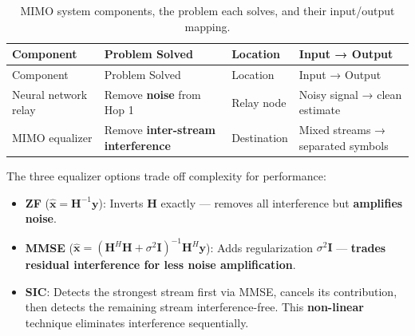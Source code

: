 \documentclass[
  english,
  12pt,
  12pt,
  a4paper,
  oneside]{report}
\providecommand{\tightlist}{%
  \setlength{\itemsep}{0pt}\setlength{\parskip}{0pt}}
\begin{document}
\begin{longtable}[]{@{}
  >{\raggedright\arraybackslash}p{}
  >{\raggedright\arraybackslash}p{}
  >{\raggedright\arraybackslash}p{}
  >{\raggedright\arraybackslash}p{}@{}}
\caption{MIMO system components, the problem each solves, and their input/output mapping.}\label{tbl:table27}\tabularnewline
\toprule\noalign{}
\begin{minipage}[b]{\linewidth}\raggedright
Component
\end{minipage} & \begin{minipage}[b]{\linewidth}\raggedright
Problem Solved
\end{minipage} & \begin{minipage}[b]{\linewidth}\raggedright
Location
\end{minipage} & \begin{minipage}[b]{\linewidth}\raggedright
Input → Output
\end{minipage} \\
\midrule\noalign{}
\endfirsthead
\toprule\noalign{}
\begin{minipage}[b]{\linewidth}\raggedright
Component
\end{minipage} & \begin{minipage}[b]{\linewidth}\raggedright
Problem Solved
\end{minipage} & \begin{minipage}[b]{\linewidth}\raggedright
Location
\end{minipage} & \begin{minipage}[b]{\linewidth}\raggedright
Input → Output
\end{minipage} \\
\midrule\noalign{}
\endhead
\bottomrule\noalign{}
\endlastfoot
Neural network relay & Remove \textbf{noise} from Hop 1 & Relay node & Noisy signal → clean estimate \\
MIMO equalizer & Remove \textbf{inter-stream interference} & Destination & Mixed streams → separated symbols \\
\end{longtable}

The three equalizer options trade off complexity for performance:

\begin{itemize}
\tightlist
\item
  \textbf{ZF} (\(\hat{\mathbf{x}} = \mathbf{H}^{-1}\mathbf{y}\)): Inverts \(\mathbf{H}\) exactly --- removes all interference but \textbf{amplifies noise}.
\item
  \textbf{MMSE} (\(\hat{\mathbf{x}} = (\mathbf{H}^H\mathbf{H} + \sigma^2\mathbf{I})^{-1}\mathbf{H}^H\mathbf{y}\)): Adds regularization \(\sigma^2\mathbf{I}\) --- \textbf{trades residual interference for less noise amplification}.
\item
  \textbf{SIC}: Detects the strongest stream first via MMSE, cancels its contribution, then detects the remaining stream interference-free. This \textbf{non-linear} technique eliminates interference sequentially.
\end{itemize}
\end{document}
